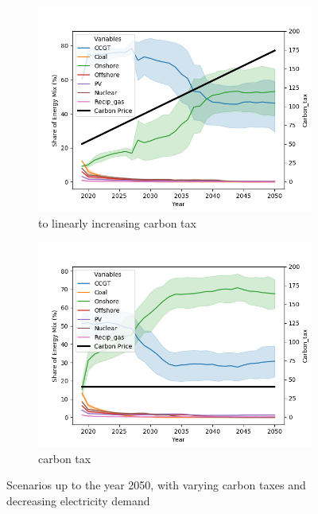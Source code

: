 \begin{figure}
	\begin{subfigure}[b]{0.475\textwidth}   
		\centering 
		\includegraphics[width=\textwidth]{figures/scenarios/demand099-carbon18-datetime.png}
		\caption[]%
		{{ to  linearly increasing carbon tax}}    
		\label{fig:demand99carbon18}
	\end{subfigure}
	\quad
	\begin{subfigure}[b]{0.475\textwidth}   
		\centering 
		\includegraphics[width=\textwidth]{figures/scenarios/demand099-carbon40-datetime.png}
		\caption[]%
		{{ carbon tax}}    
		\label{fig:demand99carbon40}
	\end{subfigure}
	\caption[ Scenarios up to the year 2050 with varying carbon taxes and decreasing demand ]
	{\small Scenarios up to the year 2050, with varying carbon taxes and decreasing electricity demand} 
	\label{fig:mean and std of nets}
\end{figure}



